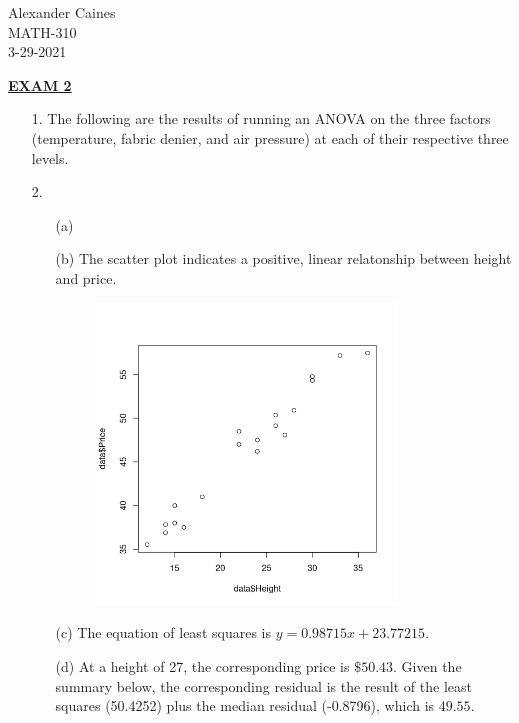 \documentclass[12pt]{article}
\begin{document}
\vspace{1.0 \baselineskip}

\begin{flushright}
	Alexander Caines\\
	MATH-310\\
	3-29-2021\\
\end{flushright}

\begin{center}
	\textbf{\underline{EXAM 2}}
\end{center}



\begin{enumerate}
	\item[1.] The following are the results of running an ANOVA on the three factors (temperature, fabric denier, and air pressure) 
	at each of their respective three levels.
	\item[2.]
		\begin{enumerate}
			\item[(a)]
			\item[(b)] The scatter plot indicates a positive, linear relatonship between height and price.
				\begin{figure}[!h]
					\centering
					\includegraphics[width=8cm]{2b.png}
				\end{figure}
			\item[(c)] The equation of least squares is $y = 0.98715x + 23.77215$.
			\item[(d)] At a height of 27, the corresponding price is $\$50.43$. Given the summary below, the 
			corresponding residual is the result of the least squares (50.4252) plus the median residual (-0.8796), which is $49.55$.

\end{enumerate}
\end{enumerate}
\end{document}
